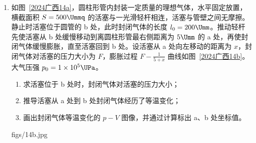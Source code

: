 \documentclass[\gkver]{gaokaozhenti}
\begin{document}
\begin{enumerate}
{\begin{enumerate}
\end{enumerate}
}

\item
如图~\ref{2024广西14a}，圆柱形管内封装一定质量的理想气体，水平固定放置，横截面积 $S = 500 \Ummq$ 的活塞与一光滑轻杆相连，活塞与管壁之间无摩擦。静止时活塞位于圆管的 b 处，此时封闭气体的长度 $l_{0} = 200 \Umm$。推动轻杆先使活塞从 b 处缓慢移动到离圆柱形管最右侧距离为 $5 \Umm$ 的 a 处，再使封闭气体缓慢膨胀，直至活塞回到 b 处。设活塞从 a 处向左移动的距离为 $x$，封闭气体对活塞的压力大小为 $F$，膨胀过程 $F - \frac{1}{5 + x}$ 曲线如图~\ref{2024广西14b}。大气压强 $p_{0} = 1 \times 10^{5} \UPa$。
\begin{enumerate}
	\item
	求活塞位于 b 处时，封闭气体对活塞的压力大小；
	\item
	推导活塞从 a 处到 b 处封闭气体经历了等温变化；
	\item
	画出封闭气体等温变化的 $p - V$ 图像，并通过计算标出 a、b 处坐标值。
\end{enumerate}
{figs/14b.jpg}

\jdanswer{
\begin{enumerate}
	\item
	$50 \UN$


\end{enumerate}}
\end{enumerate}
\end{document}
